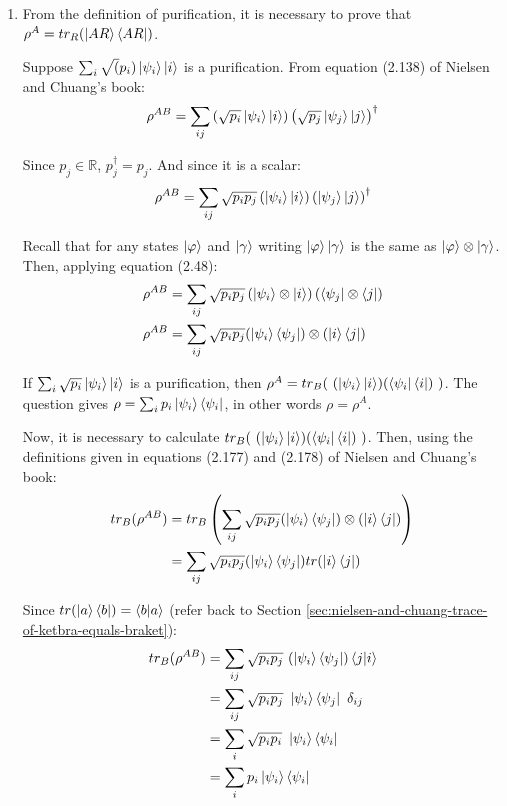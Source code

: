 \begin{enumerate}
\item From the definition of purification, it is necessary to prove that $\rho^A = tr_R(\ket{AR}\bra{AR})$.
    
    Suppose $\sum_i \sqrt(p_i) \ket{\psi_i} \ket{i}$ is a purification. From equation (2.138) of Nielsen and Chuang's book:
    \begin{align}
        \rho^{AB} = \sum_{ij} \left( \sqrt{p_i} \ket{\psi_i} \ket{i} \right) \left( \sqrt{p_j} \ket{\psi_j} \ket{j} \right) ^ \dagger
    \end{align}
    
    Since $p_j \in \mathbb{R}$, $p_j^\dagger = p_j$. And since it is a scalar:
    \begin{align}
        \rho^{AB} = \sum_{ij} \sqrt{p_i p_j} \left( \ket{\psi_i} \ket{i} \right) \left( \ket{\psi_j} \ket{j} \right) ^ \dagger
    \end{align}
    
    Recall that for any states $\ket{\varphi}$ and $\ket{\gamma}$ writing $\ket{\varphi} \ket{\gamma}$ is the same as $\ket{\varphi} \otimes \ket{\gamma}$. Then, applying equation (2.48):
    \begin{align}
        \rho^{AB} &= \sum_{ij} \sqrt{p_i p_j} \left( \ket{\psi_i} \otimes \ket{i} \right)
            \left( \bra{\psi_j} \otimes \bra{j} \right) \\
        \rho^{AB} &= \sum_{ij} \sqrt{p_i p_j} (\ket{\psi_i}\bra{\psi_j}) \otimes (\ket{i}\bra{j})
    \end{align}
    
    If $\sum_i \sqrt{p_i} \ket{\psi_i}\ket{i}$ is a purification, then
    $\rho^A = tr_B(\ (\ket{\psi_i}\ket{i}) (\bra{\psi_i}\bra{i})\ )$.
    The question gives $\rho = \sum_i p_i \ket{\psi_i}\bra{\psi_i}$, in other words $\rho = \rho^A$.
    
    Now, it is necessary to calculate $tr_B(\ (\ket{\psi_i}\ket{i}) (\bra{\psi_i}\bra{i})\ )$. Then, using the definitions given in equations (2.177) and (2.178) of Nielsen and Chuang's book:
    \begin{align}
        tr_B(\rho^{AB}) &= tr_B \left(\sum_{ij} \sqrt{p_i p_j} (\ket{\psi_i}\bra{\psi_j}) \otimes (\ket{i}\bra{j}) \right) \\
        &= \sum_{ij} \sqrt{p_i p_j} (\ket{\psi_i}\bra{\psi_j}) tr(\ket{i}\bra{j})
    \end{align}
    
    Since $tr(\ket{a}\bra{b}) = \mathop{\mathinner{ \langle{b}|{a}\rangle}}$
    (refer back to Section \ref{sec:nielsen-and-chuang-trace-of-ketbra-equals-braket}):
    \begin{align}
        tr_B(\rho^{AB}) &= \sum_{ij} \sqrt{p_i p_j}\ (\ket{\psi_i}\bra{\psi_j}) \braket{j}{i} \\
        &= \sum_{ij} \sqrt{p_i p_j}\ \ket{\psi_i}\bra{\psi_j}\ \delta_{ij} \\
        &= \sum_i \sqrt{p_i p_i}\ \ket{\psi_i}\bra{\psi_i} \\
        &= \sum_i p_i\ket{\psi_i}\bra{\psi_i}
    \end{align}
    

\end{enumerate}
